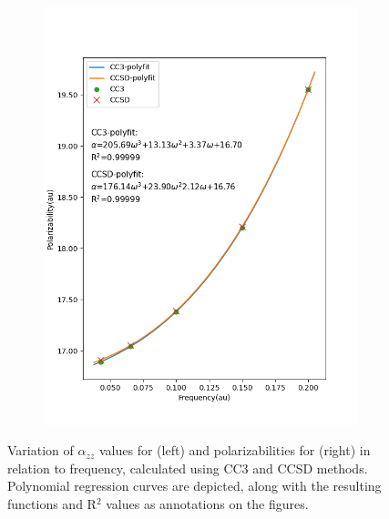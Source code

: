 \begin{figure}
\begin{subfigure}{0.495\textwidth}
     \end{subfigure}
     \hfill
     \begin{subfigure}{0.495\textwidth}
         \centering
         \includegraphics[width=\textwidth]{ch4/Figs/4-2.png}
     \end{subfigure}
     \caption{Variation of $\alpha_{zz}$ values for  (left) and polarizabilities for  (right) in relation to frequency, calculated using CC3 and CCSD methods. Polynomial regression curves are depicted, along with the resulting functions and R$^{2}$ values as annotations on the figures.}
     \label{fig:polar-polyfit}
\end{figure}
